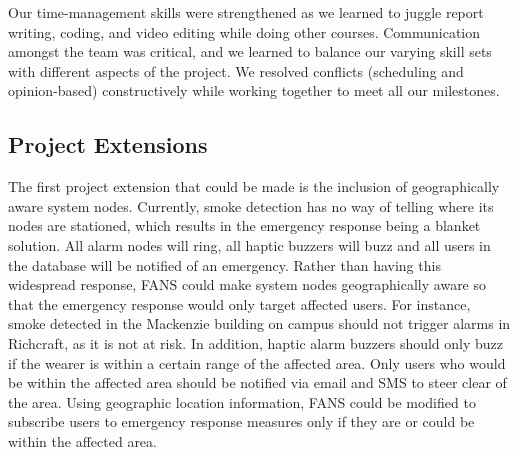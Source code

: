 Our time-management skills were strengthened as we learned to juggle report writing, coding, and video editing while
doing other courses. Communication amongst the team was critical, and we learned to balance our varying skill sets with
different aspects of the project. We resolved conflicts (scheduling and opinion-based) constructively while working
together to meet all our milestones.

\subsection{Project Extensions}

The first project extension that could be made is the inclusion of geographically aware system nodes. Currently, smoke
detection has no way of telling where its nodes are stationed, which results in the emergency response being a blanket
solution. All alarm nodes will ring, all haptic buzzers will buzz and all users in the database will be notified of an
emergency. Rather than having this widespread response, FANS could make system nodes geographically aware so that the
emergency response would only target affected users. For instance, smoke detected in the Mackenzie building on campus
should not trigger alarms in Richcraft, as it is not at risk. In addition, haptic alarm buzzers should only buzz if the
wearer is within a certain range of the affected area. Only users who would be within the affected area should be
notified via email and SMS to steer clear of the area. Using geographic location information, FANS could be modified to
subscribe users to emergency response measures only if they are or could be within the affected area.
